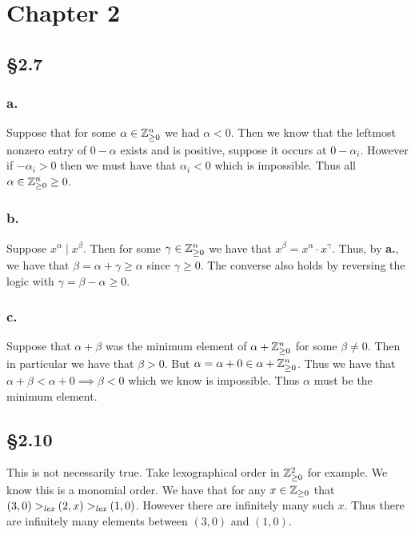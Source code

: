 \documentclass[letterpaper]{article}
\begin{document}
\clearpage

\section*{Chapter 2}

\subsection*{\S 2.7}

\subsubsection*{a.}

Suppose that for some $\alpha \in \mathbb{Z}_{\geq 0}^{n}$ we had $\alpha < 0$.
Then we know that the leftmost nonzero entry of $0 - \alpha$ exists and is positive, suppose it occurs at $0 - \alpha_{i}$.
However if $-\alpha_{i} > 0$ then we must have that $\alpha_{i} < 0$ which is impossible.
Thus all $\alpha \in \mathbb{Z}_{\geq 0}^{n} \geq 0$.

\subsubsection*{b.}

Suppose $x^{\alpha} \mid x^{\beta}$.
Then for some $\gamma \in \mathbb{Z}_{\geq 0}^{n}$ we have that $x^{\beta} = x^{\alpha} \cdot x^{\gamma}$.
Thus, by \textbf{a.}, we have that $\beta = \alpha + \gamma \geq \alpha$ since $\gamma \geq 0$.
The converse also holds by reversing the logic with $\gamma = \beta - \alpha \geq 0$.

\subsubsection*{c.}

Suppose that $\alpha + \beta$ was the minimum element of $\alpha + \mathbb{Z}_{\geq 0}^{n}$ for some $\beta \neq 0$.
Then in particular we have that $\beta > 0$.
But $\alpha = \alpha + 0 \in \alpha + \mathbb{Z}_{\geq 0}^{n}$.
Thus we have that $\alpha + \beta < \alpha + 0 \implies \beta < 0$ which we know is impossible.
Thus $\alpha$ must be the minimum element.

\subsection*{\S 2.10}

This is not necessarily true.
Take lexographical order in $\mathbb{Z}_{\geq 0}^{2}$ for example.
We know this is a monomial order.
We have that for any $x \in \mathbb{Z}_{\geq 0}$ that $(3, 0) >_{\emph{lex}} (2, x)  >_{\emph{lex}} (1, 0)$.
However there are infinitely many such $x$.
Thus there are infinitely many elements between $(3, 0)$ and $(1, 0)$.
\end{document}
